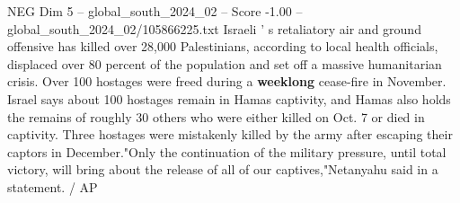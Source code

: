 \begin{textsample}{NEG Dim 5 – global\_south\_2024\_02 – Score -1.00 – global\_south\_2024\_02/105866225.txt}
Israeli ' s retaliatory air and ground offensive has killed over 28,000 Palestinians, according to local health officials, displaced over 80 percent of the population and set off a massive humanitarian crisis.
Over 100 hostages were freed during a \textbf{weeklong} cease-fire in November.
Israel says about 100 hostages remain in Hamas captivity, and Hamas also holds the remains of roughly 30 others who were either killed on Oct. 7 or died in captivity.
Three hostages were mistakenly killed by the army after escaping their captors in December."Only the continuation of the military pressure, until total victory, will bring about the release of all of our captives,"Netanyahu said in a statement. / AP

\end{textsample}
